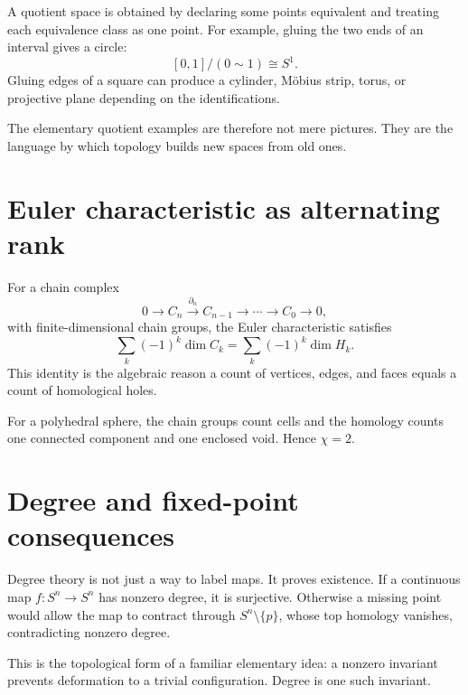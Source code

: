A quotient space is obtained by declaring some points equivalent and treating each equivalence class as one point.  For example, gluing the two ends of an interval gives a circle:
\[
  [0,1]/(0\sim1)\cong S^1.
\]
Gluing edges of a square can produce a cylinder, Möbius strip, torus, or projective plane depending on the identifications.

The elementary quotient examples are therefore not mere pictures.  They are the language by which topology builds new spaces from old ones.

\section{Euler characteristic as alternating rank}

For a chain complex
\[
  0\to C_n\xrightarrow{\partial_n}C_{n-1}\to\cdots\to C_0\to0,
\]
with finite-dimensional chain groups, the Euler characteristic satisfies
\[
  \sum_k(-1)^k\dim C_k=\sum_k(-1)^k\dim H_k.
\]
This identity is the algebraic reason a count of vertices, edges, and faces equals a count of homological holes.

For a polyhedral sphere, the chain groups count cells and the homology counts one connected component and one enclosed void.  Hence $\chi=2$.

\section{Degree and fixed-point consequences}

Degree theory is not just a way to label maps.  It proves existence.  If a continuous map $f:S^n\to S^n$ has nonzero degree, it is surjective.  Otherwise a missing point would allow the map to contract through $S^n\setminus\{p\}$, whose top homology vanishes, contradicting nonzero degree.

This is the topological form of a familiar elementary idea: a nonzero invariant prevents deformation to a trivial configuration.  Degree is one such invariant.
